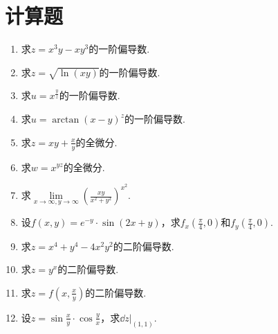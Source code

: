 \section{计算题}
\begin{enumerate}
	\item 求$ z=x^3y-xy^3 $的一阶偏导数.\vspace{4.7cm}
	\item 求$ z=\sqrt{\ln(xy)} $的一阶偏导数.\vspace{4.7cm}
	\item 求$ u=x^{\frac{y}{z}} $的一阶偏导数.\vspace{4.7cm}
	\item 求$ u=\arctan(x-y)^z $的一阶偏导数.\vspace{4.7cm}
	\item 求$ z=xy+\frac{x}{y} $的全微分.\vspace{4.7cm}
	\item 求$ w=x^{yz} $的全微分.\vspace{4.7cm}
	\item 求$ \lim\limits_{x\to\infty,y\to\infty} \left( \frac{xy}{x^2+y^2} \right)^{x^2} $.\vspace{4.7cm}
	\item 设$ f(x,y)=e^{-y}\cdot\sin(2x+y) $，求$ f_x(\frac{\pi}{4},0) $和$ f_y(\frac{\pi}{4},0) $.\vspace{4.7cm}
	\item 求$ z=x^4+y^4-4x^2y^2 $的二阶偏导数.\vspace{4.7cm}
	\item 求$ z=y^x $的二阶偏导数.\vspace{4.7cm}
	\item 求$ z=f(x,\frac{x}{y}) $的二阶偏导数.\vspace{4.7cm}
	\item 设$ z=\sin\frac{x}{y}\cdot\cos\frac{y}{x} $，求$ \dd z\big|_{(1,1)} $.\vspace{4.7cm}
\end{enumerate}
